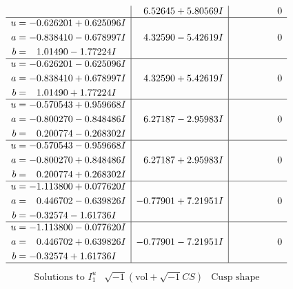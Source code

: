 \documentclass[1p]{elsarticle_modified}
\theoremstyle{definition}
\newcommand{\I}{\sqrt{-1}}
\begin{document}
$$\begin{array}{c|c|c}
 & \phantom{-}6.52645 + 5.80569 I & \phantom{-0.000000 } 0 \\ \hline\begin{aligned}
u &= -0.626201 + 0.625096 I \\
a &= -0.838410 - 0.678997 I \\
b &= \phantom{-}1.01490 - 1.77224 I\end{aligned}
 & \phantom{-}4.32590 - 5.42619 I & \phantom{-0.000000 } 0 \\ \hline\begin{aligned}
u &= -0.626201 - 0.625096 I \\
a &= -0.838410 + 0.678997 I \\
b &= \phantom{-}1.01490 + 1.77224 I\end{aligned}
 & \phantom{-}4.32590 + 5.42619 I & \phantom{-0.000000 } 0 \\ \hline\begin{aligned}
u &= -0.570543 + 0.959668 I \\
a &= -0.800270 - 0.848486 I \\
b &= \phantom{-}0.200774 - 0.268302 I\end{aligned}
 & \phantom{-}6.27187 - 2.95983 I & \phantom{-0.000000 } 0 \\ \hline\begin{aligned}
u &= -0.570543 - 0.959668 I \\
a &= -0.800270 + 0.848486 I \\
b &= \phantom{-}0.200774 + 0.268302 I\end{aligned}
 & \phantom{-}6.27187 + 2.95983 I & \phantom{-0.000000 } 0 \\ \hline\begin{aligned}
u &= -1.113800 + 0.077620 I \\
a &= \phantom{-}0.446702 - 0.639826 I \\
b &= -0.32574 - 1.61736 I\end{aligned}
 & -0.77901 + 7.21951 I & \phantom{-0.000000 } 0 \\ \hline\begin{aligned}
u &= -1.113800 - 0.077620 I \\
a &= \phantom{-}0.446702 + 0.639826 I \\
b &= -0.32574 + 1.61736 I\end{aligned}
 & -0.77901 - 7.21951 I & \phantom{-0.000000 } 0\\
 \hline 
 \end{array}$$\newpage$$\begin{array}{c|c|c}  
\text{Solutions to }I^u_{1}& \I (\text{vol} + \sqrt{-1}CS) & \text{Cusp shape}\\

\end{array}$$
\end{document}
